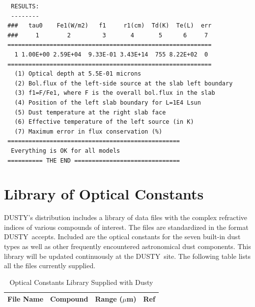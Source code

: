 \documentclass[11pt]{article}
\def\D  {{\sf DUSTY}}
\def\mic    {\hbox{$\mu$m}}
\begin{document}
\begin{appendix}
\begin{verbatim}
  RESULTS:
  --------
 ###   tau0    Fe1(W/m2)   f1     r1(cm)  Td(K)  Te(L)  err
 ###     1        2         3       4       5      6     7
 ==========================================================
   1 1.00E+00 2.59E+04  9.33E-01 3.43E+14  755 8.22E+02  0
 ==========================================================
   (1) Optical depth at 5.5E-01 microns
   (2) Bol.flux of the left-side source at the slab left boundary
   (3) f1=F/Fe1, where F is the overall bol.flux in the slab
   (4) Position of the left slab boundary for L=1E4 Lsun
   (5) Dust temperature at the right slab face
   (6) Effective temperature of the left source (in K)
   (7) Maximum error in flux conservation (%)
 =================================================
  Everything is OK for all models
 ========== THE END ==============================
\end{verbatim}

\newpage

\section{Library of Optical Constants}
\label{nklib}

\D's distribution includes a library of data files with the complex refractive
indices of various compounds of interest.  The files are standardized in the
format \D\ accepts. Included are the optical constants for the seven built-in
dust types as well as other frequently encountered astronomical dust
components.  This library will be updated continuously at the \D\ site. The
following table lists all the files currently supplied.

\begin{table}[h]
\begin{center}

\caption{\hfil Optical Constants Library Supplied with Dusty} \centerline{}

\begin{tabular}{llrr}     
\hline \hline
 \multicolumn{1}{c}{File Name}    &
 \multicolumn{1}{c}{Compound}     &
 \multicolumn{1}{c}{Range (\mic)} &
 \multicolumn{1}{c}{Ref}
 \\
    \hline


\end{tabular}
\end{center}
\end{table}
\end{appendix}
\end{document}
